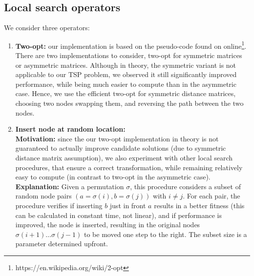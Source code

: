 \documentclass[a4paper,10pt]{article}
\begin{document}
\subsection{Local search operators}
	We consider three operators:
	\begin{enumerate}
		\item \textbf{Two-opt:} our implementation is based on the pseudo-code found on online\footnote{https://en.wikipedia.org/wiki/2-opt}. There are two implementations to consider, two-opt for symmetric matrices or asymmetric matrices. Although in theory, the symmetric variant is not applicable to our TSP problem, we observed it still significantly improved performance, while being much easier to compute than in the asymmetric case. Hence, we use the efficient two-opt for symmetric distance matrices, choosing two nodes swapping them, and reversing the path between the two nodes.
		
		\item \textbf{Insert node at random location:}\\
		\textbf{Motivation:} since the our two-opt implementation in theory is not guaranteed to actually improve candidate solutions (due to symmetric distance matrix assumption), we also experiment with other local search procedures, that ensure a correct transformation, while remaining relatively easy to compute (in contrast to two-opt in the asymmetric case). \\
		\textbf{Explanation:} Given a permutation $\sigma$, this procedure considers a subset of random node pairs $\left(a = \sigma(i), b = \sigma(j)\right)$ with $i \neq j$. For each pair, the procedure verifies if inserting $b$ just in front $a$ results in a better fitness (this can be calculated in constant time, not linear), and if performance is improved, the node is inserted, resulting in the original nodes $\sigma(i+1) \dots \sigma(j-1)$ to be moved one step to the right. The subset size is a parameter determined upfront.


\end{enumerate}
\end{document}
